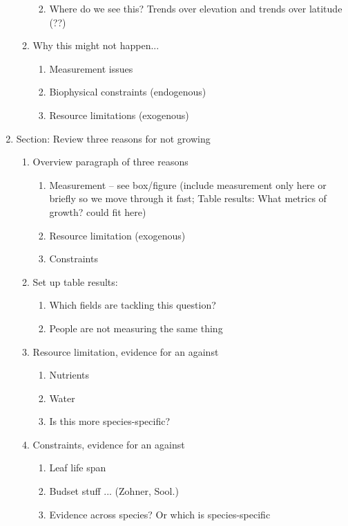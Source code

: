 \documentclass[11pt,letter]{article}
\begin{document}
\begin{enumerate}
\begin{enumerate}
\begin{enumerate}
\begin{enumerate}
\begin{enumerate}
\end{enumerate}
\end{enumerate}
\item Where do we see this? Trends over elevation and trends over latitude (??)
\end{enumerate}
\item Why this might not happen...
\begin{enumerate}
\item Measurement issues 
\item Biophysical constraints (endogenous)
\item Resource limitations (exogenous) 
\end{enumerate}
\end{enumerate}
\item Section: Review three reasons for not growing 
\begin{enumerate} 
\item Overview paragraph of three reasons
\begin{enumerate} 
\item Measurement -- see box/figure  (include measurement only here or briefly so we move through it fast; Table results: What metrics of growth? could fit here)
\item Resource limitation (exogenous)
\item Constraints
\end{enumerate}
\item Set up table results: 
\begin{enumerate}
\item Which fields are tackling this question?
\item People are not measuring the same thing
\end{enumerate}
\item Resource limitation, evidence for an against 
\begin{enumerate}
\item Nutrients
\item Water
\item Is this more species-specific?
\end{enumerate}
\item Constraints, evidence for an against 
\begin{enumerate}
\item Leaf life span
\item Budset stuff ... (Zohner, Sool.)
\item Evidence across species? Or which is species-specific

\end{enumerate}
\end{enumerate}
\end{enumerate}
\end{document}

